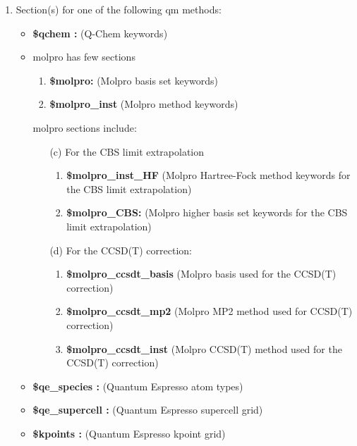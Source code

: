 \documentclass[11pt,letterpaper]{article}
\begin{document}
\begin{spacing}{1.0}
\begin{enumerate}
\item Section(s) for one of the following qm methods:
  \begin{itemize}
  \item {\bf \$qchem :} (Q-Chem keywords) \\ 
  \item molpro has few sections \\
    \begin{enumerate}
    \item{\bf \$molpro:} (Molpro basis set keywords) \\
    \item{\bf \$molpro\_inst} (Molpro method keywords)\\
    \end{enumerate}
     molpro sections include:\\ 
    \begin{enumerate}
    \item[(c)] For the CBS limit extrapolation \\
      \begin{enumerate}
      \item {\bf \$molpro\_inst\_HF} (Molpro Hartree-Fock method keywords for the CBS limit extrapolation)\\
      \item{\bf \$molpro\_CBS:} (Molpro higher basis set keywords for the CBS limit extrapolation)\\
      \end{enumerate}
    \item[(d)] For the CCSD(T) correction:
      \begin{enumerate}
        \item {\bf \$molpro\_ccsdt\_basis} (Molpro basis used for the CCSD(T) correction)\\
        \item {\bf \$molpro\_ccsdt\_mp2} (Molpro MP2 method used for CCSD(T) correction)\\
        \item {\bf \$molpro\_ccsdt\_inst} (Molpro CCSD(T) method used for the CCSD(T) correction)\\
      \end{enumerate}
    \end{enumerate}
  \item {\bf \$qe\_species :} (Quantum Espresso atom types) \\ 
  \item {\bf \$qe\_supercell :} (Quantum Espresso supercell grid) \\ 
  \item {\bf \$kpoints :} (Quantum Espresso kpoint grid) \\ 
  \end{itemize}  
              

\end{enumerate}
\end{spacing}
\end{document}

